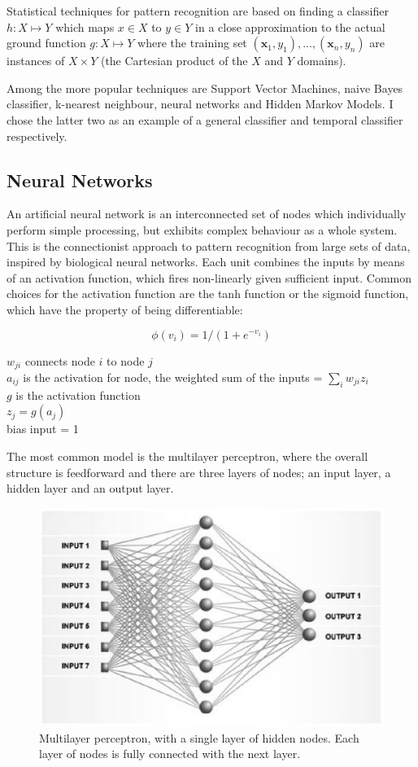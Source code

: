 \documentclass[12pt,a4,notitlepage]{report}
\renewcommand{\_}{\texttt{\symbol{95}}}
\newcommand{\<}{\texttt{\symbol{60}}}
\renewcommand{\>}{\texttt{\symbol{62}}}
\begin{document}
Statistical techniques for pattern recognition are based on finding a classifier
$ h: X \mapsto Y $ which maps $x \in X$ to $y \in Y$ in a close approximation to the actual ground function $ g: X \mapsto Y $ where the training set $ (\mathbf x_1,y_1), ... , (\mathbf x_n, y_n) $ are instances of $X \times Y$ (the Cartesian product of the $X$ and $Y$ domains).

Among the more popular techniques are Support Vector Machines, naive Bayes classifier, k-nearest neighbour, neural networks and Hidden Markov Models. I chose the latter two as an example of a general classifier and temporal classifier respectively.

\subsection{Neural Networks}

An artificial neural network is an interconnected set of nodes which individually perform simple processing, but exhibits complex behaviour as a whole system. This is the connectionist approach to pattern recognition from large sets of data, inspired by  biological neural networks. Each unit combines the inputs by means of an activation function, which fires non-linearly given sufficient input. Common choices for the activation function are the tanh function or the sigmoid function, which have the property of being differentiable:

\[ \phi(v_i) = 1/(1+e^{-v_i}) \]

$w_{ji}$ connects node $i$ to node $j$ \\
$a_{ij}$ is the activation for node, the weighted sum of the inputs = $\sum_i {w_{ji}z_i}$ \\
$g$ is the activation function \\
$z_j = g(a_j)$ \\
bias input = 1

The most common model is the multilayer perceptron, where the overall structure is feedforward and there are three layers of nodes; an input layer, a hidden layer and an output layer.

\begin{figure}
\centering
\includegraphics[scale=0.6,angle=0]{diagrams/neural.ps}
\caption{Multilayer perceptron, with a single layer of hidden nodes. Each layer of nodes is fully connected with the next layer.}
\label{mlp}
\end{figure}
\end{document}
